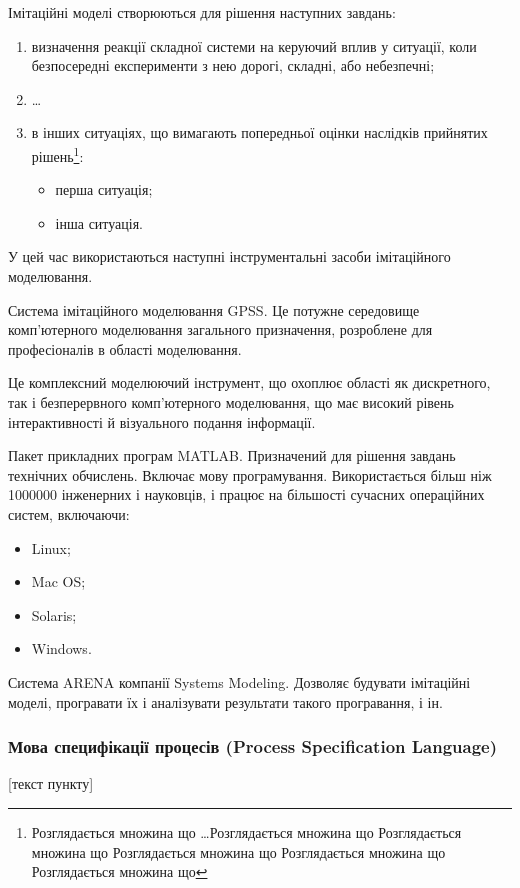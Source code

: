 Імітаційні моделі створюються для рішення наступних завдань:
\begin{enumerate}
\item визначення реакції складної системи на керуючий вплив у ситуації, коли безпосередні експерименти з нею дорогі, складні, або небезпечні;
\item \dots
\item в інших ситуаціях, що вимагають попередньої оцінки наслідків прийнятих
рішень\footnote{Розглядається множина що \ldots Розглядається множина що
Розглядається множина що Розглядається множина що Розглядається множина що
Розглядається множина що}:
\begin{itemize}
\item перша ситуація;
\item інша ситуація.
\end{itemize}
\end{enumerate}
У цей час використаються наступні інструментальні засоби імітаційного моделювання.
\begin{longEnumerate}
\item Система імітаційного моделювання GPSS. Це потужне середовище комп'ютерного моделювання загального призначення, розроблене для професіоналів в області моделювання. 
\item Це комплексний моделюючий інструмент, що охоплює області як дискретного, так і безперервного комп'ютерного моделювання, що має високий рівень інтерактивності й візуального подання інформації.
\item Пакет прикладних програм MATLAB. Призначений для рішення завдань технічних обчислень. Включає мову програмування. Використається більш ніж 1000000 інженерних і науковців, і працює на більшості сучасних операційних систем, включаючи:
\begin{itemize}
\item Linux; 
\item Mac OS; 
\item Solaris; 
\item Windows.
\end{itemize}
\item Система ARENA компанії Systems Modeling. Дозволяє будувати імітаційні моделі, програвати їх і аналізувати результати такого програвання, і ін.
\end{longEnumerate}

\subsubsection{Мова специфікації процесів (Process Specification Language)}
[текст пункту]
